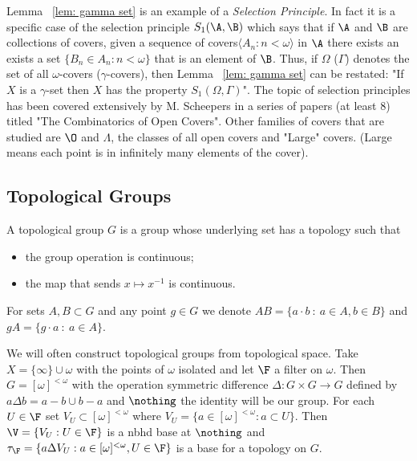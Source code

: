 \documentclass{article}
\begin{document}
Lemma ~\ref{lem: gamma set} is an example of a \textit{Selection Principle}. In fact it is a specific case of the selection principle \(S_1(\A, \B)\) which says that if \(\A\) and \(\B\) are collections of covers, given a sequence of covers\(\langle A_n : n < \omega\rangle\) in \(\A\) there exists an exists a set \(\{B_n \in A_n : n < \omega\}\) that is an element of \(\B\). Thus, if \(\Omega\) (\(\Gamma\)) denotes the set of all \(\omega\)-covers (\(\gamma\)-covers), then  Lemma ~\ref{lem: gamma set} can be restated: "If \(X\) is a \(\gamma\)-set then \(X\) has the property \(S_1(\Omega, \Gamma)\)". The topic of selection principles has been covered extensively by M. Scheepers in a series of papers (at least 8) titled "The Combinatorics of Open Covers". Other families of covers that are studied are \(\O\) and \(\Lambda\), the classes of all open covers and "Large" covers. (Large means each point is in infinitely many elements of the cover).
\subsection{Topological Groups}
\begin{defn}
    A topological group \(G\) is a group whose underlying set has a topology such that 
    \begin{itemize}
        \item the group operation is continuous;
        \item the map that sends \(x \mapsto x^{-1}\) is continuous.
    \end{itemize}
    For sets \(A, B \subset G\) and any point \(g \in G\) we denote \(AB = \{a\cdot b \: : \: a \in A, b \in B\}\) and \(gA = \{g\cdot a \: : \: a \in A\}\).
\end{defn}
 

We will often construct topological groups from topological space. Take \(X = \{\infty\} \cup \omega\) with the points of \(\omega\) isolated and let \(\F\) a filter on \(\omega\). Then \(G = [\omega]^{<\omega}\) with the operation symmetric difference \(\Delta: G \times G \to G\) defined by \(a\Delta b = a- b \cup b- a\) and \(\nothing\) the identity will be our group. For each \(U \in \F\) set \(V_U \subset [\omega]^{<\omega}\) where \(V_U = \{a \in [\omega]^{<\omega}: a \subset U\}\). Then \(\V = \{V_U : U \in \F\}\) is a nbhd base at \(\nothing\) and \(\tau_{\F} = \{a\Delta V_U : a \in [\omega]^{<\omega}, U 
\in \F\}\) is a base for a topology on \(G\).
\end{document}
